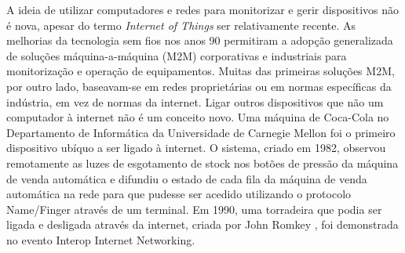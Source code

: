 \documentclass[conference]{IEEEtran}
\begin{document}

A ideia de utilizar computadores e redes para monitorizar e gerir dispositivos
não é nova, apesar do termo \textit{Internet of Things} ser relativamente
recente. As melhorias da tecnologia sem fios nos anos 90 permitiram a adopção
generalizada de soluções máquina-a-máquina (M2M) corporativas e industriais
para monitorização e operação de equipamentos. Muitas das primeiras soluções
M2M, por outro lado, baseavam-se em redes proprietárias ou em normas específicas
da indústria, em vez de normas da internet. Ligar outros dispositivos que
não um computador à internet não é um conceito novo. Uma máquina de Coca-Cola
no Departamento de Informática da Universidade de Carnegie Mellon \cite{EverhartInteresting}
foi o primeiro dispositivo ubíquo a ser ligado à internet. O sistema, criado
em 1982, observou remotamente as luzes de esgotamento de stock nos botões
de pressão da máquina de venda automática e difundiu o estado de cada fila
da máquina de venda automática na rede para que pudesse ser acedido utilizando
o protocolo Name/Finger através de um terminal. Em 1990, uma torradeira que
podia ser ligada e desligada através da internet, criada por John Romkey \cite{RomkeyToast},
foi demonstrada no evento Interop Internet Networking.
\end{document}
